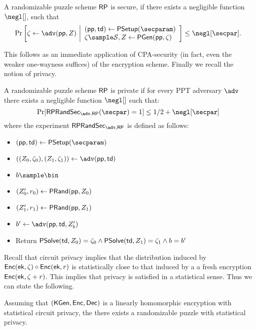 \begin{definition}[Security]
\label{def:rp-sec}
A randomizable puzzle scheme $\mathsf{RP}$ is secure, if there exists a negligible function 
$\negl[]$, such that
\[
	\Pr\left[
	\zeta \gets \adv(\pparam, Z)
	~\middle\vert
	\begin{array}{l}
	(\pparam, \td) \gets \psetup(\secparam) \\
	\zeta \sample \solspace, Z \gets \pgen(\pparam, \zeta)
	\end{array}
	\right] \leq \negl[\secpar].
\]
\end{definition}
This follows as an immediate application of CPA-security (in fact, even the weaker one-wayness suffices) of the encryption scheme. Finally we recall the notion of privacy.
\begin{definition}[Privacy]
\label{def:rp-privacy}
A randomizable puzzle scheme $\mathsf{RP}$ is private if for every PPT adversary $\adv$ there exists a negligible function $\negl[]$ such that:
$$\Pr[\RPUnlink_{\adv, \RP}(\secpar) = 1] \leq 1/2 + \negl[\secpar]$$ where the experiment 
$\RPUnlink_{\adv, \RP}$ is defined as follows: 
\begin{itemize}
    \item $(\pparam,\td) \gets \psetup(\secparam)$
	\item $((Z_0, \zeta_0), (Z_1, \zeta_1)) \gets \adv(\pparam, \td)$
	\item $b \sample \bin$
	\item $(Z_0', r_0) \gets \mathsf{PRand}(\mathsf{pp}, Z_0)$ 
	\item $(Z_1', r_1) \gets \mathsf{PRand}(\mathsf{pp}, Z_1)$
	\item $b' \gets \adv(\pparam, \td, Z_b')$
	\item Return $\mathsf{PSolve}(\mathsf{td}, Z_0) = \zeta_0 \land \mathsf{PSolve}(\mathsf{td}, Z_1) = \zeta_1 \\ \land b = b'$
\end{itemize}
\end{definition}
Recall that circuit privacy implies that the distribution induced by 
${\mathsf{Enc}}(\mathsf{ek},\allowbreak \zeta) \circ {\mathsf{Enc}}(\mathsf{ek}, r)$ is statistically close to that induced by a a fresh encryption ${\mathsf{Enc}}(\mathsf{ek}, \zeta + r)$. This implies that privacy is satisfied in a statistical sense. Thus we can state the following.
\begin{lemma}
Assuming that $({\mathsf{KGen}}, {\mathsf{Enc}}, {\mathsf{Dec}})$ is a linearly homomorphic encryption with statistical circuit privacy, the there exists a randomizable puzzle with statistical privacy.
\end{lemma}